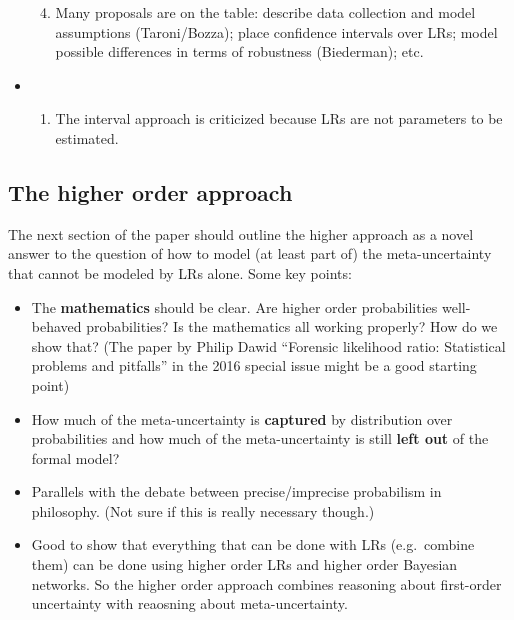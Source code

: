 \documentclass[
  10pt,
  dvipsnames,enabledeprecatedfontcommands]{scrartcl}
\providecommand{\tightlist}{%
  \setlength{\itemsep}{0pt}\setlength{\parskip}{0pt}}
\begin{document}
\begin{itemize}
\begin{enumerate}
  \setcounter{enumi}{3}
  \tightlist
  \item
    Many proposals are on the table: describe data collection and model
    assumptions (Taroni/Bozza); place confidence intervals over LRs;
    model possible differences in terms of robustness (Biederman); etc.
  \end{enumerate}
\item
  \begin{enumerate}
  \def\labelenumi{(\alph{enumi})}
  \setcounter{enumi}{21}
  \tightlist
  \item
    The interval approach is criticized because LRs are not parameters
    to be estimated.
  \end{enumerate}
\end{itemize}

\hypertarget{the-higher-order-approach}{%
\subsection{The higher order approach}\label{the-higher-order-approach}}

The next section of the paper should outline the higher approach as a
novel answer to the question of how to model (at least part of) the
meta-uncertainty that cannot be modeled by LRs alone. Some key points:

\begin{itemize}
\item
  The \textbf{mathematics} should be clear. Are higher order
  probabilities well-behaved probabilities? Is the mathematics all
  working properly? How do we show that? (The paper by Philip Dawid
  ``Forensic likelihood ratio: Statistical problems and pitfalls'' in
  the 2016 special issue might be a good starting point)
\item
  How much of the meta-uncertainty is \textbf{captured} by distribution
  over probabilities and how much of the meta-uncertainty is still
  \textbf{left out} of the formal model?
\item
  Parallels with the debate between precise/imprecise probabilism in
  philosophy. (Not sure if this is really necessary though.)
\item
  Good to show that everything that can be done with LRs (e.g.~combine
  them) can be done using higher order LRs and higher order Bayesian
  networks. So the higher order approach combines reasoning about
  first-order uncertainty with reaosning about meta-uncertainty.
\end{itemize}
\end{document}
